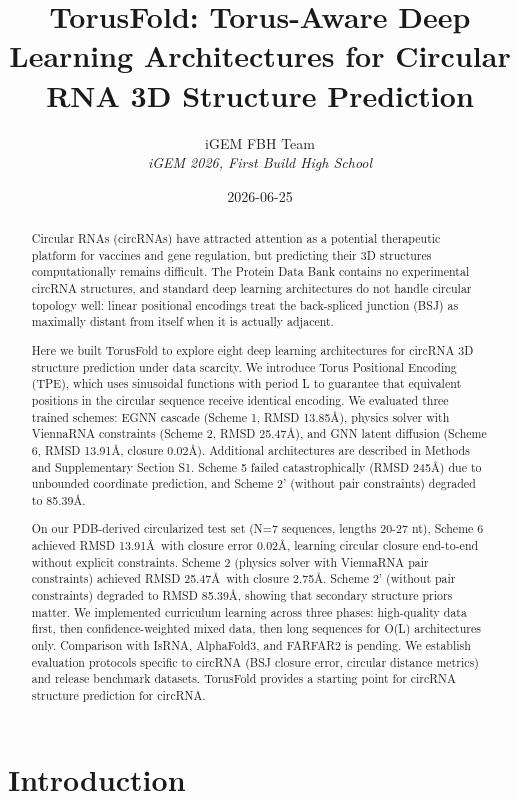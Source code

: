 \documentclass[12pt]{article}
\title{TorusFold: Torus-Aware Deep Learning Architectures for Circular RNA 3D Structure Prediction}
\author{
iGEM FBH Team\\
\textit{iGEM 2026, First Build High School}
}
\date{2026-06-25}
\begin{document}
\maketitle

\begin{abstract}
Circular RNAs (circRNAs) have attracted attention as a potential therapeutic platform for vaccines and gene regulation, but predicting their 3D structures computationally remains difficult. The Protein Data Bank contains no experimental circRNA structures, and standard deep learning architectures do not handle circular topology well: linear positional encodings treat the back-spliced junction (BSJ) as maximally distant from itself when it is actually adjacent.

Here we built TorusFold to explore eight deep learning architectures for circRNA 3D structure prediction under data scarcity. We introduce Torus Positional Encoding (TPE), which uses sinusoidal functions with period L to guarantee that equivalent positions in the circular sequence receive identical encoding. We evaluated three trained schemes: EGNN cascade (Scheme 1, RMSD 13.85\AA), physics solver with ViennaRNA constraints (Scheme 2, RMSD 25.47\AA), and GNN latent diffusion (Scheme 6, RMSD 13.91\AA, closure 0.02\AA). Additional architectures are described in Methods and Supplementary Section S1. Scheme 5 failed catastrophically (RMSD 245\AA) due to unbounded coordinate prediction, and Scheme 2' (without pair constraints) degraded to 85.39\AA.

On our PDB-derived circularized test set (N=7 sequences, lengths 20-27 nt), Scheme 6 achieved RMSD 13.91\AA\ with closure error 0.02\AA, learning circular closure end-to-end without explicit constraints. Scheme 2 (physics solver with ViennaRNA pair constraints) achieved RMSD 25.47\AA\ with closure 2.75\AA. Scheme 2' (without pair constraints) degraded to RMSD 85.39\AA, showing that secondary structure priors matter. We implemented curriculum learning across three phases: high-quality data first, then confidence-weighted mixed data, then long sequences for O(L) architectures only. Comparison with IsRNA, AlphaFold3, and FARFAR2 is pending. We establish evaluation protocols specific to circRNA (BSJ closure error, circular distance metrics) and release benchmark datasets. TorusFold provides a starting point for circRNA structure prediction for circRNA.
\end{abstract}

\section{Introduction}
\end{document}
